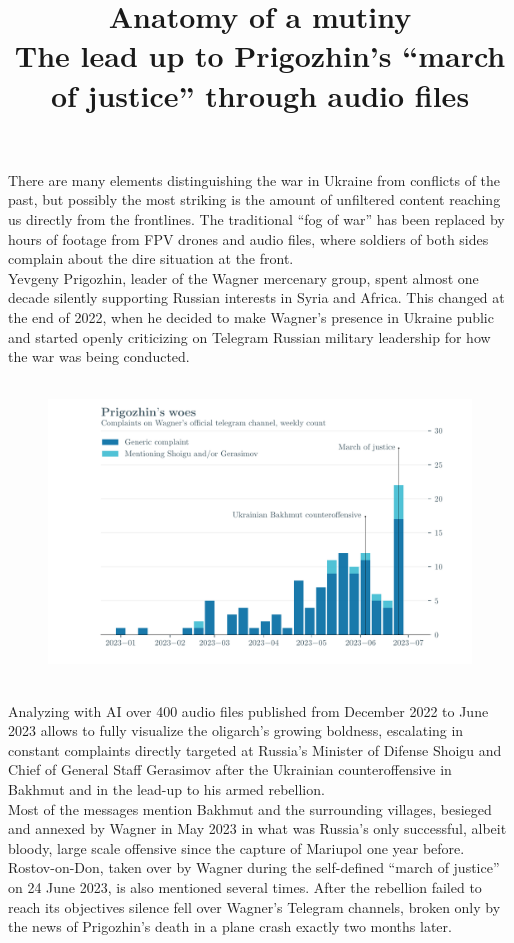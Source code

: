 \documentclass[11pt]{article}
\title{%
       Anatomy of a mutiny \\
       \large The lead up to Prigozhin's ``march of justice'' through audio files}
\author{}
\date{}
\begin{document}
\maketitle

\noindent
There are many elements distinguishing the war in Ukraine from conflicts of the past, but possibly 
the most striking is the amount of unfiltered content reaching us directly from the frontlines. The traditional 
``fog of war'' has been replaced by hours of footage from FPV drones and audio files, where soldiers of both sides 
complain about the dire situation at the front.\\
Yevgeny Prigozhin, leader of the Wagner mercenary group, spent almost one decade silently supporting Russian 
interests in Syria and Africa. This changed at the end of 2022, when he decided to make Wagner's presence in Ukraine public and started 
openly criticizing on Telegram Russian military leadership for how the war was being conducted.\\
\vspace{0.5cm}

\begin{figure}[H]
    \centering
    \includegraphics[height=8cm]{../../outputs/main_report/figures/hist.pdf}
\end{figure}

\vspace{0.5cm}
\noindent
Analyzing with AI over 400 audio files published from December 2022 to June 2023 allows to fully visualize the oligarch's growing boldness, escalating 
in constant complaints directly targeted at Russia's Minister of Difense Shoigu and Chief of General Staff Gerasimov after the Ukrainian counteroffensive in Bakhmut 
and in the lead-up to his armed rebellion.\\
Most of the messages mention Bakhmut and the surrounding villages, besieged and annexed by Wagner in May 2023 in what was Russia's only successful, albeit bloody, large 
scale offensive since the capture of Mariupol one year before. Rostov-on-Don, taken over by Wagner during the self-defined ``march of justice'' on 24 June 2023, is also mentioned several times. After the 
rebellion failed to reach its objectives silence fell over Wagner's Telegram channels, broken only by the news of Prigozhin's death in a plane crash exactly two months later. 
\end{document}
